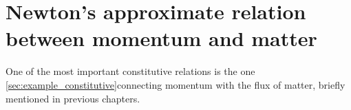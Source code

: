 \documentclass[a4paper,12pt,%
onecolumn,oneside,%
british%
]{memoir}
\providecommand{\href}[2]{#2}
\renewcommand*{\bm}[1]{\textpdfrender{TextRenderingMode=2,LineWidth=0.2pt}{\boldsymbol{#1}}}
\renewcommand*{\|}[1][]{\nonscript\:#1\vert\nonscript\:\mathopen{}}
\newcommand*{\sect}{\S}%
\newcommand*{\furl}[2]{\href{#1}{#2}\pagenote{\url{#1}}}
\renewcommand*{\autoref}[3][\sect\,\ref]{\textcolor{blue}{#3}
\raisebox{0.6ex}{\color{blue}\miniscule%
\faIcon{angle-right}%
\;#1{#2}\;p.\,\pageref{#2}}}
\newcommand*{\masse}{mass-energy}
\newcommand*{\yg}{\bm{g}} %
\newcommand*{\yN}{N}
\newcommand*{\yrho}{\rho}
\newcommand*{\ym}{m}%
\begin{document}
% 




\section{Newton's approximate relation between momentum and matter}
\label{sec:bal_momentum_Newton}

One of the most important constitutive relations is the one \ref{sec:example_constitutive}{connecting momentum with the flux of matter}, briefly mentioned in previous chapters.

\end{document}
